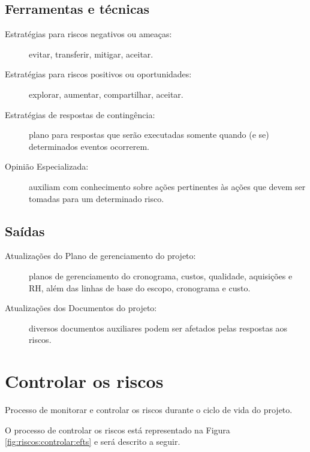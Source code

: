 \section{Ferramentas e técnicas}

\begin{description}
	
	\item[Estratégias para riscos negativos ou ameaças:] evitar, transferir, mitigar, aceitar.
	
	\item[Estratégias para riscos positivos ou oportunidades:] explorar, aumentar, compartilhar, aceitar.
	
	\item[Estratégias de respostas de contingência:] plano para respostas que serão executadas somente quando (e se) determinados eventos ocorrerem.
	
	\item[Opinião Especializada:] auxiliam com conhecimento sobre ações pertinentes às ações que devem ser tomadas para um determinado risco.
	
\end{description}

\section{Saídas}

\begin{description}
	
	\item[Atualizações do Plano de gerenciamento do projeto:] planos de gerenciamento do cronograma, custos, qualidade, aquisições e RH, além das linhas de base do escopo, cronograma e custo.
	
	\item[Atualizações dos Documentos do projeto:] diversos documentos auxiliares podem ser afetados pelas respostas aos riscos.	
	
\end{description}


\chapter{Controlar os riscos}

Processo de monitorar e controlar os riscos durante o ciclo de vida do projeto.

O processo de controlar os riscos está representado na Figura \ref{fig:riscos:controlar:efts} e será descrito a seguir.

